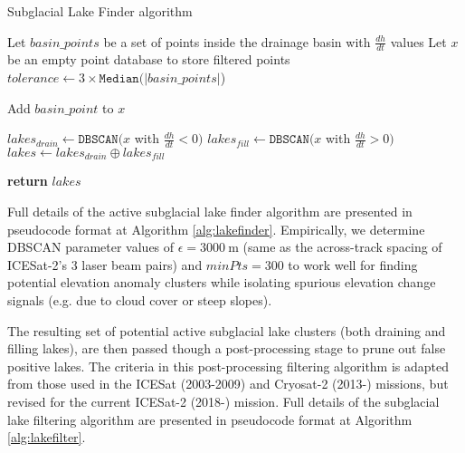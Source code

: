 \begin{algorithm}
  \caption{Subglacial Lake Finder algorithm}\label{alg:lakefinder}
  \begin{algorithmic}

      \State Let $basin\_points$ be a set of points inside the drainage basin with $\frac{dh}{dt}$ values %
      \State Let $x$ be an empty point database to store filtered points
      \State $tolerance \gets 3 \times \texttt{Median}(\lvert basin\_points \rvert$)

           
            \State Add $basin\_point$ to $x$
          \EndIf
        \EndFor

      \State $lakes_{drain} \gets \texttt{DBSCAN}(x$ with $\frac{dh}{dt} < 0)$ 
      \State $lakes_{fill} \gets \texttt{DBSCAN}(x$ with $\frac{dh}{dt} > 0)$ 
      \State $lakes \gets lakes_{drain} \oplus lakes_{fill}$ 

      \State \textbf{return} $lakes$
    \EndFor
  \end{algorithmic}
\end{algorithm}

Full details of the active subglacial lake finder algorithm are presented in pseudocode format at Algorithm \ref{alg:lakefinder}.
Empirically, we determine \gls{DBSCAN} parameter values of $\epsilon=\SI{3000}{\metre}$ (same as the across-track spacing of ICESat-2's 3 laser beam pairs) and $minPts=300$ to work well for finding potential elevation anomaly clusters while isolating spurious elevation change signals (e.g. due to cloud cover or steep slopes).

The resulting set of potential active subglacial lake clusters (both draining and filling lakes), are then passed though a post-processing stage to prune out false positive lakes.
The criteria in this post-processing filtering algorithm is adapted from those used in the ICESat (2003-2009) \citep{FrickerActiveSubglacialWater2007,Smithinventoryactivesubglacial2009} and Cryosat-2 (2013-) \citep[e.g.][]{KimActivesubglaciallakes2016,SiegfriedThirteenyearssubglacial2018} missions, but revised for the current ICESat-2 (2018-) mission.
Full details of the subglacial lake filtering algorithm are presented in pseudocode format at Algorithm \ref{alg:lakefilter}.

